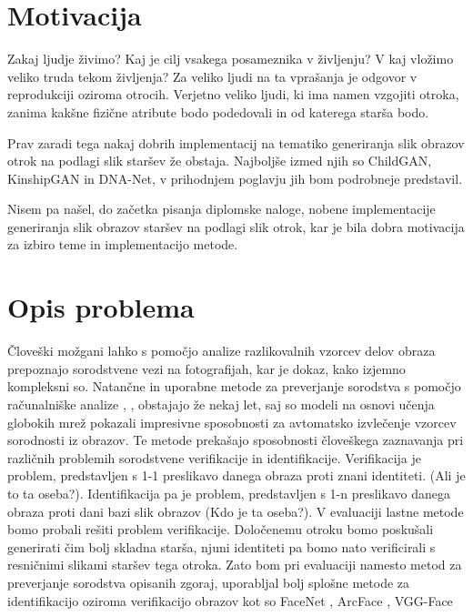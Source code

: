 \documentclass[a4paper,12pt,openright]{book}
\begin{document}
\section{Motivacija}
Zakaj ljudje živimo? Kaj je cilj vsakega posameznika v življenju? V kaj vložimo veliko truda tekom življenja? Za veliko ljudi na ta vprašanja je odgovor v reprodukciji oziroma otrocih. Verjetno veliko ljudi, ki ima namen vzgojiti otroka, zanima kakšne fizične atribute bodo podedovali in od katerega starša bodo. 

Prav zaradi tega nakaj dobrih implementacij na tematiko generiranja slik obrazov otrok na podlagi slik staršev že obstaja. Najboljše izmed njih so ChildGAN\cite{cui2021heredity}, KinshipGAN\cite{zkan2018KinshipganSO} in DNA-Net\cite{Gao2021WhatWY}, v prihodnjem poglavju jih bom podrobneje predstavil.

Nisem pa našel, do začetka pisanja diplomske naloge, nobene implementacije generiranja slik obrazov staršev na podlagi slik otrok, kar je bila dobra motivacija za izbiro teme in implementacijo metode.



\section{Opis problema}
Človeški možgani lahko s pomočjo analize razlikovalnih vzorcev delov obraza prepoznajo sorodstvene vezi na fotografijah, kar je dokaz, kako izjemno kompleksni so. Natančne in uporabne metode za preverjanje sorodstva s pomočjo računalniške analize \cite{KINNET}, \cite{KinshipCNN}, \cite{FIWverification} obstajajo že nekaj let, saj so modeli na osnovi učenja globokih mrež pokazali impresivne sposobnosti za avtomatsko izvlečenje vzorcev sorodnosti iz obrazov. Te metode prekašajo sposobnosti človeškega zaznavanja pri različnih problemih sorodstvene verifikacije in identifikacije. 
Verifikacija je problem, predstavljen s 1-1 preslikavo danega obraza proti znani identiteti. (Ali je to ta oseba?). Identifikacija pa je problem, predstavljen s 1-n preslikavo danega obraza proti dani bazi slik obrazov (Kdo je ta oseba?). V evaluaciji lastne metode bomo probali rešiti problem verifikacije. Določenemu otroku bomo poskušali generirati čim bolj skladna starša, njuni identiteti pa bomo nato verificirali s resničnimi slikami staršev tega otroka. Zato bom pri evaluaciji namesto metod za preverjanje sorodstva opisanih zgoraj, uporabljal bolj splošne metode za identifikacijo oziroma verifikacijo obrazov kot so FaceNet \cite{facenet}, ArcFace \cite{arcface}, VGG-Face \cite{Parkhi15}
\end{document}
